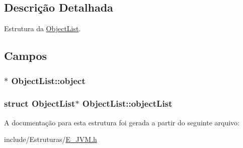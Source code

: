 \subsection{Descrição Detalhada}
Estrutura da \hyperlink{struct_object_list}{Object\+List}. 

\subsection{Campos}
\hypertarget{struct_object_list_aae49442726f57917e2d6611c62f1e071}{}
\subsubsection[{object}]{$\ast$ Object\+List\+::object}\label{struct_object_list_aae49442726f57917e2d6611c62f1e071}
\hypertarget{struct_object_list_a7d359d3713e54aec6a628a23ce886aec}{}
\subsubsection[{object\+List}]{\setlength{\rightskip}{0pt plus 5cm}struct {\bf Object\+List}$\ast$ Object\+List\+::object\+List}\label{struct_object_list_a7d359d3713e54aec6a628a23ce886aec}


A documentação para esta estrutura foi gerada a partir do seguinte arquivo\+:\begin{DoxyCompactItemize}
\item 
include/\+Estruturas/\hyperlink{_e___j_v_m_8h}{E\+\_\+\+J\+V\+M.\+h}\end{DoxyCompactItemize}
